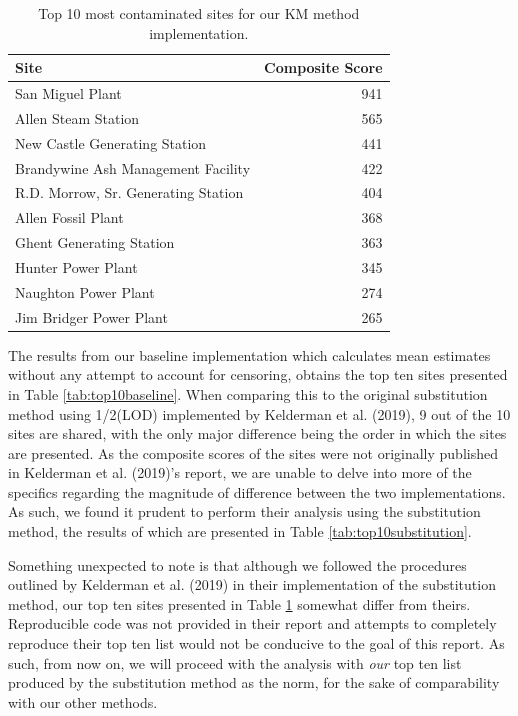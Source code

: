 \documentclass[12pt, twoside]{amherstthesis}
\begin{document}
\begin{table}

\caption{\label{tab:top10km}Top 10 most contaminated sites 
  for our KM method implementation.}
\centering
\fontsize{11.5}{13.5}\selectfont
\begin{tabular}[t]{lr}
\toprule
Site & Composite Score\\
\midrule
San Miguel Plant & 941\\
\addlinespace
Allen Steam Station & 565\\
\addlinespace
New Castle Generating Station & 441\\
\addlinespace
Brandywine Ash Management Facility & 422\\
\addlinespace
R.D. Morrow, Sr. Generating Station & 404\\
\addlinespace
Allen Fossil Plant & 368\\
\addlinespace
Ghent Generating Station & 363\\
\addlinespace
Hunter Power Plant & 345\\
\addlinespace
Naughton Power Plant & 274\\
\addlinespace
Jim Bridger Power Plant & 265\\
\bottomrule
\end{tabular}
\end{table}
The results from our baseline implementation which calculates mean estimates without any attempt to account for censoring, obtains the top ten sites presented in Table \ref{tab:top10baseline}. When comparing this to the original substitution method using 1/2(LOD) implemented by Kelderman et al. (2019), 9 out of the 10 sites are shared, with the only major difference being the order in which the sites are presented. As the composite scores of the sites were not originally published in Kelderman et al. (2019)'s report, we are unable to delve into more of the specifics regarding the magnitude of difference between the two implementations. As such, we found it prudent to perform their analysis using the substitution method, the results of which are presented in Table \ref{tab:top10substitution}.

Something unexpected to note is that although we followed the procedures outlined by Kelderman et al. (2019) in their implementation of the substitution method, our top ten sites presented in Table \ref{tab:top10km} somewhat differ from theirs. Reproducible code was not provided in their report and attempts to completely reproduce their top ten list would not be conducive to the goal of this report. As such, from now on, we will proceed with the analysis with \emph{our} top ten list produced by the substitution method as the norm, for the sake of comparability with our other methods.
\end{document}
